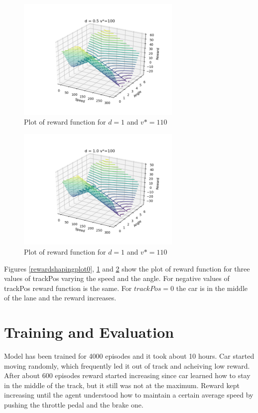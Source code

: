 \documentclass[Lau,oneside,noexaminfo]{sapthesis} %
\begin{document}
\begin{figure}[H]
  \centering
  \includegraphics[width=0.7\textwidth]{reward_plot05}
  \caption{Plot of reward function for $d = 1$ and $v*=110$}
  \label{rewardshapingplot05}
\end{figure}
\begin{figure}[H]
  \centering
  \includegraphics[width=0.7\textwidth]{reward_plot1}
  \caption{Plot of reward function for $d = 1$ and $v*=110$}
  \label{rewardshapingplot1}
\end{figure}
Figures \ref{rewardshapingplot0}, \ref{rewardshapingplot05} and \ref{rewardshapingplot1} show the plot of reward function for three values of trackPos varying the speed and the angle. For negative values of trackPos reward function is the same. For $trackPos = 0$ the car is in the middle of the lane and the reward increases.
\chapter{Training and Evaluation}
Model has been trained for 4000 episodes and it took about 10 hours. Car started moving randomly, which frequently led it out of track and acheiving low reward. After about 600 episodes reward started increasing since car learned how to stay in the middle of the track, but it still was not at the maximum. Reward kept increasing until the agent understood how to maintain a certain average speed by pushing the throttle pedal and the brake one.
\end{document}
